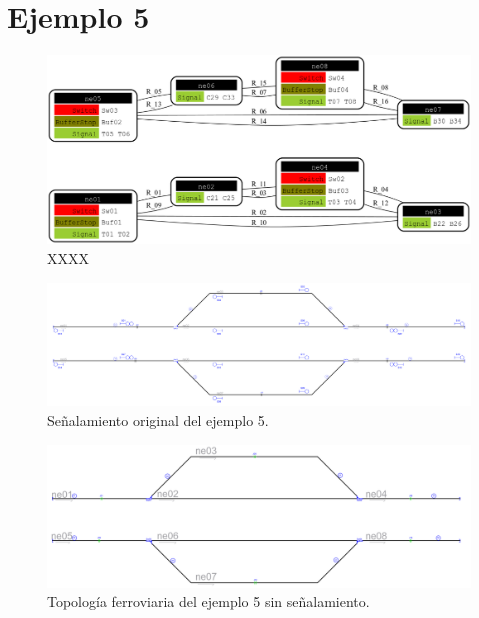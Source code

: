 \section{Ejemplo 5}

    \lipsum[1]
    
    \begin{figure}[h]
    	\centering
    	\includegraphics[width=1\textwidth]{Figuras/Graph_5}
    	\centering\caption{XXXX}
    \end{figure}
    
    \lipsum[1]

    \begin{figure}[h]
        \centering
        \includegraphics[width=1\textwidth]{resultados-obtenidos/ejemplo5/images/5_original.png}
        \centering\caption{Señalamiento original del ejemplo 5.}
    \end{figure}

    \begin{figure}[h]
        \centering
        \includegraphics[width=1\textwidth]{resultados-obtenidos/ejemplo5/images/5_empty.png}
        \centering\caption{Topología ferroviaria del ejemplo 5 sin señalamiento.}
    \end{figure}

